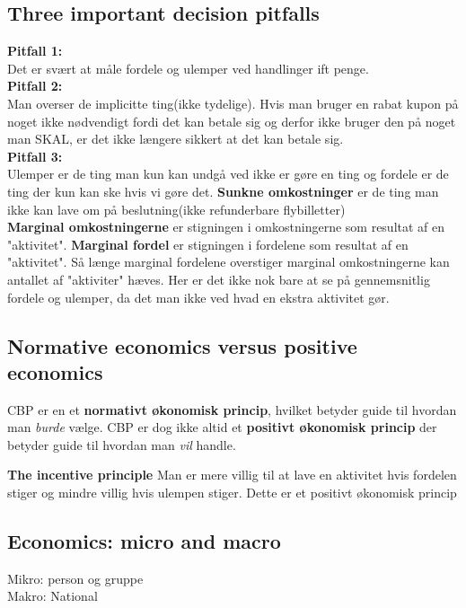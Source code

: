 \subsection{Three important decision pitfalls}
\textbf{Pitfall 1:}\\
Det er svært at måle fordele og ulemper ved handlinger ift penge. \\
\textbf{Pitfall 2:}\\
Man overser de implicitte ting(ikke tydelige). Hvis man bruger en rabat kupon på noget ikke nødvendigt fordi det kan betale sig og derfor ikke bruger den på noget man SKAL, er det ikke længere sikkert at det kan betale sig. \\
\textbf{Pitfall 3:}\\
Ulemper er de ting man kun kan undgå ved ikke er gøre en ting og fordele er de ting der kun kan ske hvis vi gøre det. \textbf{Sunkne omkostninger} er de ting man ikke kan lave om på beslutning(ikke refunderbare flybilletter)\\
\textbf{Marginal omkostningerne} er stigningen i omkostningerne som resultat af en "aktivitet". \textbf{Marginal fordel} er stigningen i fordelene som resultat af en "aktivitet". Så længe marginal fordelene overstiger marginal omkostningerne kan antallet af "aktiviter" hæves. Her er det ikke nok bare at se på gennemsnitlig fordele og ulemper, da det man ikke ved hvad en ekstra aktivitet gør. 

\subsection{Normative economics versus positive economics}
CBP er en et 
\textbf{normativt økonomisk princip}, hvilket betyder guide til hvordan man \textit{burde} vælge. CBP er dog ikke altid et \textbf{
positivt økonomisk princip} der betyder guide til hvordan man \textit{vil} handle. 
\begin{defn}\textbf{The incentive principle} %
\newline
Man er mere villig til at lave en aktivitet hvis fordelen stiger og mindre villig hvis ulempen stiger. Dette er et positivt økonomisk princip
\end{defn}

\subsection{Economics: micro and macro}
Mikro: person og gruppe\\
Makro: National


